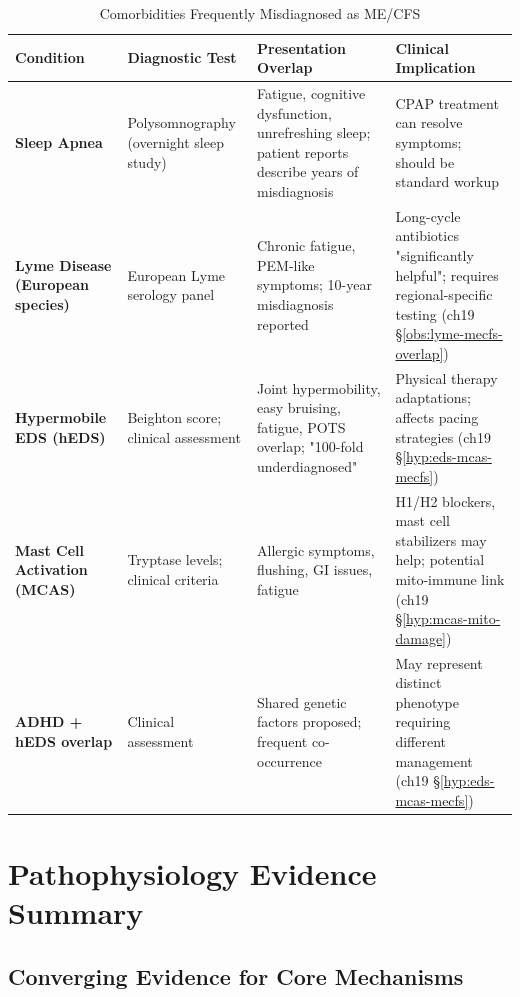 \begin{table}[htbp]
\centering
\caption{Comorbidities Frequently Misdiagnosed as ME/CFS}
\label{tab:comorbidity-misdiagnosis}
\scriptsize
\begin{tabular}{p{2.5cm}p{2.5cm}p{4cm}p{3cm}}
\toprule
\textbf{Condition} & \textbf{Diagnostic Test} & \textbf{Presentation Overlap} & \textbf{Clinical Implication} \\
\midrule
\textbf{Sleep Apnea} & Polysomnography (overnight sleep study) & Fatigue, cognitive dysfunction, unrefreshing sleep; patient reports describe years of misdiagnosis & CPAP treatment can resolve symptoms; should be standard workup \\
\midrule
\textbf{Lyme Disease (European species)} & European Lyme serology panel & Chronic fatigue, PEM-like symptoms; 10-year misdiagnosis reported & Long-cycle antibiotics "significantly helpful"; requires regional-specific testing (ch19 \S\ref{obs:lyme-mecfs-overlap}) \\
\midrule
\textbf{Hypermobile EDS (hEDS)} & Beighton score; clinical assessment & Joint hypermobility, easy bruising, fatigue, POTS overlap; "100-fold underdiagnosed" & Physical therapy adaptations; affects pacing strategies (ch19 \S\ref{hyp:eds-mcas-mecfs}) \\
\midrule
\textbf{Mast Cell Activation (MCAS)} & Tryptase levels; clinical criteria & Allergic symptoms, flushing, GI issues, fatigue & H1/H2 blockers, mast cell stabilizers may help; potential mito-immune link (ch19 \S\ref{hyp:mcas-mito-damage}) \\
\midrule
\textbf{ADHD + hEDS overlap} & Clinical assessment & Shared genetic factors proposed; frequent co-occurrence & May represent distinct phenotype requiring different management (ch19 \S\ref{hyp:eds-mcas-mecfs}) \\
\bottomrule
\end{tabular}
\end{table}

\section{Pathophysiology Evidence Summary}
\label{sec:pathophysiology-evidence-summary}

\subsection{Converging Evidence for Core Mechanisms}
\label{subsec:core-mechanisms-evidence}

